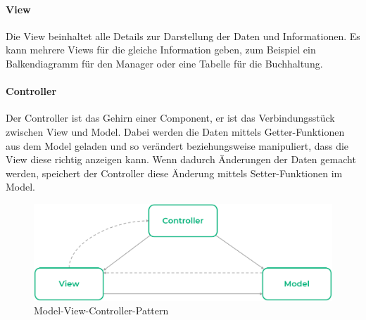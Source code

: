 \paragraph{View}
Die View beinhaltet alle Details zur Darstellung der Daten und Informationen.
Es kann mehrere Views für die gleiche Information geben, zum Beispiel ein
Balkendiagramm für den Manager oder eine Tabelle für die Buchhaltung.

\paragraph{Controller}
Der Controller ist das Gehirn einer Component, er ist das Verbindungsstück zwischen View und Model.
Dabei werden die Daten mittels Getter-Funktionen aus dem Model geladen und so verändert beziehungsweise manipuliert, dass die View diese richtig
anzeigen kann.
Wenn dadurch Änderungen der Daten gemacht werden, speichert der Controller diese Änderung mittels Setter-Funktionen im Model.

\begin{figure}[hbt!]
    \centering
    \includegraphics[scale=0.5]{pics/mvc_design_pattern}
    \caption{Model-View-Controller-Pattern}
    \label{fig:mvc_design_pattern}
\end{figure}
